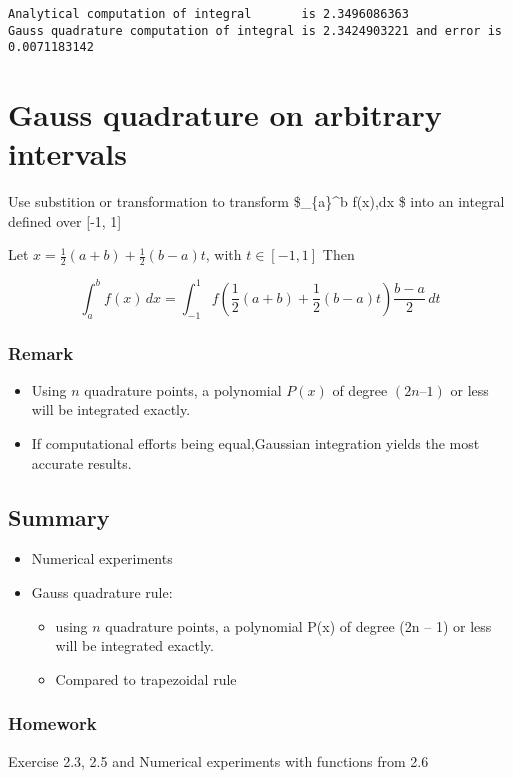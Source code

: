 \documentclass[11pt]{article}
\providecommand{\tightlist}{%
      \setlength{\itemsep}{0pt}\setlength{\parskip}{0pt}}
\begin{document}
    \begin{Verbatim}[commandchars=\\\{\}]
Analytical computation of integral       is 2.3496086363
Gauss quadrature computation of integral is 2.3424903221 and error is 0.0071183142

    \end{Verbatim}

    \section{Gauss quadrature on arbitrary
intervals}\label{gauss-quadrature-on-arbitrary-intervals}

Use substition or transformation to transform \$\int\_\{a\}\^{}b f(x),dx
\$ into an integral defined over {[}-1, 1{]}

Let \(x = \frac{1}{2}(a+b)+\frac{1}{2}(b-a)t\), with \(t \in [-1, 1]\)
Then

\[ \int_{a}^b f(x)\,dx = \int_{-1}^1 f\left(\frac{1}{2}(a+b)+\frac{1}{2}(b-a)t \right) \frac{b-a}{2}\,dt\]

\subsubsection{Remark}\label{remark}

\begin{itemize}
\tightlist
\item
  Using \(n\) quadrature points, a polynomial \(P(x)\) of degree
  \((2n – 1)\) or less will be integrated exactly.
\item
  If computational efforts being equal,Gaussian integration yields the
  most accurate results.
\end{itemize}

    \subsection{Summary}\label{summary}

\begin{itemize}
\item
  Numerical experiments
\item
  Gauss quadrature rule:

  \begin{itemize}
  \tightlist
  \item
    using \(n\) quadrature points, a polynomial P(x) of degree (2n -- 1)
    or less will be integrated exactly.
  \item
    Compared to trapezoidal rule
  \end{itemize}
\end{itemize}

\subsubsection{Homework}\label{homework}

Exercise 2.3, 2.5 and Numerical experiments with functions from 2.6


    
    
    
    
\end{document}
